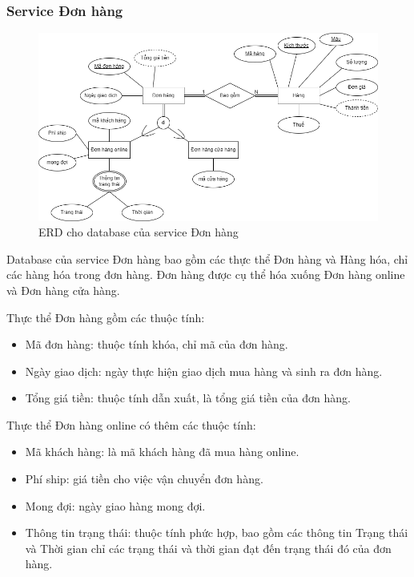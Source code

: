 \subsubsection{Service Đơn hàng}
\begin{figure}[!htp]
    \begin{center}
        \includegraphics[width=1\textwidth]{img/database/erd/shop_online-đơnhàng.png}
        \newline
        \caption{ERD cho database của service Đơn hàng}
    \end{center}
\end{figure}

\par Database của service Đơn hàng bao gồm các thực thể Đơn hàng và Hàng hóa, chỉ các hàng hóa trong đơn hàng. Đơn hàng được cụ thể hóa xuống Đơn hàng online và Đơn hàng cửa hàng.
\par Thực thể Đơn hàng gồm các thuộc tính:
\begin{itemize}
    \item Mã đơn hàng: thuộc tính khóa, chỉ mã của đơn hàng.
    \item Ngày giao dịch: ngày thực hiện giao dịch mua hàng và sinh ra đơn hàng.
    \item Tổng giá tiền: thuộc tính dẫn xuất, là tổng giá tiền của đơn hàng.
\end{itemize}

\par Thực thể Đơn hàng online có thêm các thuộc tính:
\begin{itemize}
    \item Mã khách hàng: là mã khách hàng đã mua hàng online.
    \item Phí ship: giá tiền cho việc vận chuyển đơn hàng.
    \item Mong đợi: ngày giao hàng mong đợi.
    \item Thông tin trạng thái: thuộc tính phức hợp, bao gồm các thông tin Trạng thái và Thời gian chỉ các trạng thái và thời gian đạt đến trạng thái đó của đơn hàng.
\end{itemize}

